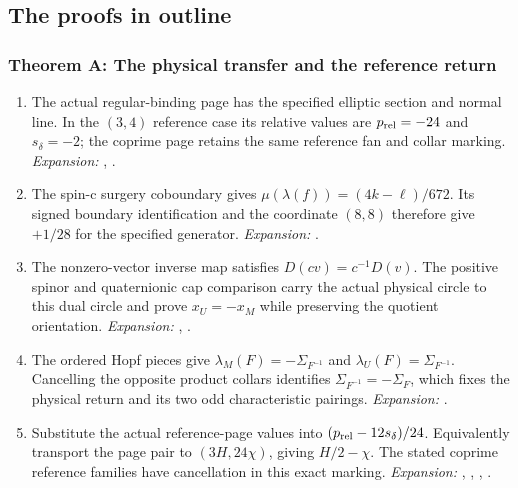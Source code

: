 \subsection{The proofs in outline}

\hypertarget{outline-IV-A}{}
\subsubsection*{Theorem A: The physical transfer and the reference return}
\begin{enumerate}[label=\arabic*.,leftmargin=*]

\item\hypertarget{step-IV-A-1}{} The actual regular-binding page has the specified elliptic section
and normal line. In the $(3,4)$ reference case its relative values
are $p_{\rm rel}=-24$ and $s_\delta=-2$; the coprime page retains
the same reference fan and collar marking.
\textit{Expansion:} , .

\item\hypertarget{step-IV-A-2}{} The spin-c surgery coboundary gives
$\mu(\lambda(f))=(4k-\ell)/672$. Its signed boundary identification
and the coordinate $(8,8)$ therefore give $+1/28$ for the specified
generator.
\textit{Expansion:} .

\item\hypertarget{step-IV-A-3}{} The nonzero-vector inverse map satisfies $D(cv)=c^{-1}D(v)$.
The positive spinor and quaternionic cap comparison carry the actual
physical circle to this dual circle and prove $x_U=-x_M$ while
preserving the quotient orientation.
\textit{Expansion:} , .

\item\hypertarget{step-IV-A-4}{} The ordered Hopf pieces give
$\lambda_M(F)=-\Sigma_{F^{-1}}$ and
$\lambda_U(F)=\Sigma_{F^{-1}}$. Cancelling the opposite product
collars identifies $\Sigma_{F^{-1}}=-\Sigma_F$, which fixes the
physical return and its two odd characteristic pairings.
\textit{Expansion:} .

\item\hypertarget{step-IV-A-5}{} Substitute the actual reference-page values into
$(p_{\rm rel}-12s_\delta)/24$. Equivalently transport the page pair
to $(3H,24\chi)$, giving $H/2-\chi$. The stated coprime reference
families have cancellation in this exact marking.
\textit{Expansion:} , , , .

\end{enumerate}

